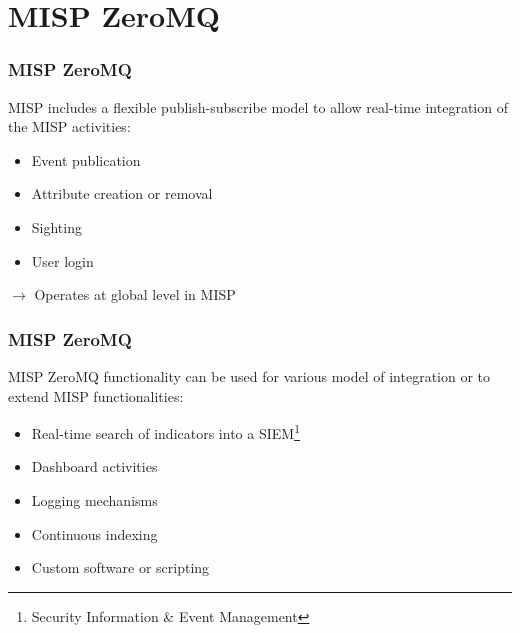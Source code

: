 
\begin{frame}[t,plain]
\titlepage
\end{frame}

\section{MISP ZeroMQ}
\begin{frame}
\frametitle{MISP ZeroMQ}
    MISP includes a flexible publish-subscribe model to allow real-time integration of the MISP activities:
    \begin{itemize}
        \item Event publication
        \item Attribute creation or removal
        \item Sighting
        \item User login
    \end{itemize}
    \begin{center}
        $\rightarrow$ Operates at global level in MISP
    \end{center}
\end{frame}

\begin{frame}
    \frametitle{MISP ZeroMQ}
MISP ZeroMQ functionality can be used for various model of integration or to extend MISP functionalities:
    \begin{itemize}
        \item Real-time search of indicators into a SIEM\footnote{Security Information \& Event Management}
        \item Dashboard activities
        \item Logging mechanisms
        \item Continuous indexing
        \item Custom software or scripting
    \end{itemize}
\end{frame}

